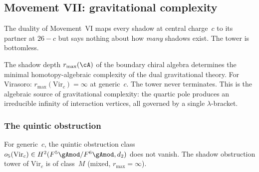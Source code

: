 \subsection{Movement VII: gravitational complexity}
\label{subsec:gravity-complexity}

The duality of Movement~VI maps every shadow at central
charge~$c$ to its partner at $26 - c$ but says nothing about
how \emph{many} shadows exist. The tower is bottomless.

The shadow depth $r_{\max}(\cA)$ of the boundary chiral algebra
determines the minimal homotopy-algebraic complexity of the dual
gravitational theory. For Virasoro:
$r_{\max}(\mathrm{Vir}_c) = \infty$ at generic~$c$. The tower
never terminates. This is the algebraic source of gravitational
complexity: the quartic pole produces an irreducible infinity of
interaction vertices, all governed by a single $\lambda$-bracket.

\subsubsection*{The quintic obstruction}

\begin{theorem}
\label{thm:gravity-quintic-obstruction}
For generic~$c$, the quintic obstruction class
$o_5(\mathrm{Vir}_c) \in H^2(F^5\gAmod/F^6\gAmod, d_2)$
does not vanish. The shadow obstruction tower of $\mathrm{Vir}_c$ is of
class~$M$ \textup{(}mixed, $r_{\max} = \infty$\textup{)}.
\end{theorem}

